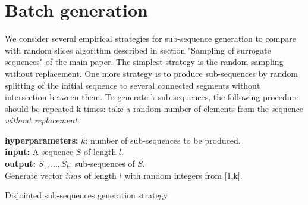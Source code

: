 \documentclass{article}
\begin{document}







\appendix

\section{Batch generation} \label{app-sec-bg}

We consider several empirical strategies for sub-sequence generation to compare with random slices algorithm described in section "Sampling of surrogate sequences" of the main paper.
The simplest strategy is the random sampling without replacement.
One more strategy is to produce sub-sequences by random splitting of the initial sequence to several connected segments without intersection between them. To generate k sub-sequences, the following procedure should be repeated k times: take a random number of elements from the sequence \textit{without replacement}.

\begin{algorithm}
\SetAlgoLined
\textbf{hyperparameters:} $k$: number of sub-sequences to be produced. \\
\textbf{input:} A sequence $S$ of length $l$. \\
\textbf{output:} $S_1,...,S_k$: sub-sequences of $S$. \\

\BlankLine
Generate vector $inds$ of length $l$ with random integers from [1,k].\\
\caption{Disjointed sub-sequences generation strategy}
\label{alg-disj-ss}

\end{algorithm}
\end{document}
